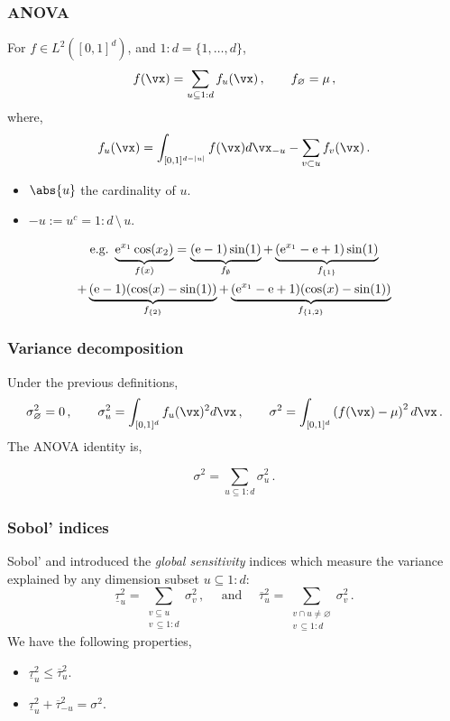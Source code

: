 \documentclass[11pt,compress]{beamer} %
\newcommand{\E}{{\rm e}}
\begin{document}
\begin{frame}
\frametitle{ANOVA}
For $f\in L^2\left([0,1]^d\right)$, and $1\!:\!d=\{1,\dots,d\}$,
\begin{equation*}
f(\vx)=\sum \limits_{u \subseteq 1:d} f_u(\vx)\, , \qquad f_{\varnothing} = \mu\, ,
\label{anova}
\end{equation*}
where,
\[f_u(\vx)= \int_{[0,1]^{d-|u|}} f(\vx) d{\vx}_{-u} - \sum \limits_{v \subset u} f_v(\vx)\, .\]

\vspace{-2ex}
\begin{itemize}
\item $\abs{u}$ the cardinality of $u$.
\item $-u:=u^c=1\!:\!d \, \setminus \, u$.
\end{itemize}

\vspace{-5ex}

\begin{multline*}
\text{e.g.\ } \underbrace{\E^{x_1} \cos(x_2)}_{f(x)} 
= \underbrace{(\E - 1)\sin(1)}_{f_\emptyset} 
+ \underbrace{(\E^{x_1} - \E + 1)\sin(1)}_{f_{\{1\}}} \\
+ \underbrace{(\E - 1)(\cos(x) - \sin(1))}_{f_{\{2\}}} 
+ \underbrace{(\E^{x_1} - \E + 1)(\cos(x) - \sin(1))}_{f_{\{1,2\}}}
\end{multline*}
\end{frame}

\begin{frame}
\frametitle{Variance decomposition}
Under the previous definitions,
\begin{equation*}
\sigma^2_{\varnothing} = 0\, ,\qquad \sigma^2_{u} =\int_{[0,1]^{d}} f_u(\vx)^2 d{\vx}\, ,\qquad \sigma^2 =\int_{[0,1]^{d}} \left(f(\vx)-\mu\right)^2 d{\vx}\, .
\end{equation*}
The ANOVA identity is,

\[
\sigma^2 = \sum \limits_{u \subseteq 1:d} \sigma_u^2 \, .
\]
\end{frame}

\begin{frame}
\frametitle{Sobol' indices}
Sobol' 
 and  
introduced the \emph{global sensitivity} indices which 
measure the variance 
explained by any dimension subset $u \subseteq 1\!:\!d$:
\begin{equation*}
\underline{\tau}_u^2 = \sum_{\substack{v \subseteq u \\ v\,\subseteq 1:d}} \sigma_v^2\, , 
\quad \text{ and } \quad \overline{\tau}_u^2 = \sum_{\substack{v \cap u\neq\varnothing \\ 
v\,\subseteq 1:d}} \sigma_v^2\, .
\end{equation*}
We have the following properties,
\begin{itemize}
\item $\underline{\tau}_u^2\leq \overline{\tau}_u^2$.
\item $\underline{\tau}_u^2 + \overline{\tau}_{-u}^2 =\sigma^2$.
\end{itemize}
\end{frame}
\end{document}

